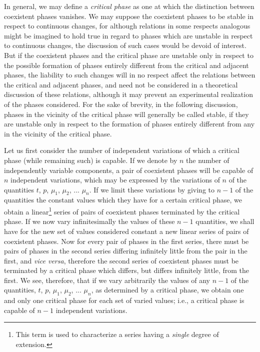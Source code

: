 \documentclass[12pt]{article}
\begin{document}
In general, we may define a \textit{critical phase} as one at which the distinction between coexistent phases vanishes. We may suppose the coexistent phases to be stable in respect to continuous changes, for although relations in some respects analogous might be imagined to hold true in regard to phases which are unstable in respect to continuous changes, the discussion of such cases would be devoid of interest. But if the coexistent phases and the critical phase are unstable only in respect to the possible formation of phases entirely different from the critical and adjacent phases, the liability to such changes will in no respect affect the relations between the critical and adjacent phases, and need not be considered in a theoretical discussion of these relations, although it may prevent an experimental realization of the phases considered. For the sake of brevity, in the following discussion, phases in the vicinity of the critical phase will generally be called stable, if they are unstable only in respect to the formation of phases entirely different from any in the vicinity of the critical phase. 

Let us first consider the number of independent variations of which a critical phase (while remaining such) is capable. If we denote by $n$ the number of independently variable components, a pair of coexistent phases will be capable of $n$ independent variations, which may be expressed by the variations of $n$ of the quantities $t$, $p$, $\mu_1$, $\mu_2$, ... $\mu_n$. If we limit these variations by giving to $n -1$ of the quantities the constant values which they have for a certain critical phase, we obtain a linear\footnote{This term is used to characterize a series having a \textit{single} degree of extension.} series of pairs of coexistent phases terminated by the critical phase. If we now vary infinitesimally the values of these $n -1$ quantities, we shall have for the new set of values considered constant a new linear series of pairs of coexistent phases. Now for every pair of phases in the first series, there must be pairs of phases in the second series differing infinitely little from the pair in the first, and \textit{vice versa}, therefore the second series of coexistent phases must be terminated by a critical phase which differs, but differs infinitely little, from the first. We see, therefore, that if we vary arbitrarily the values of any $n -1$ of the quantities, $t$, $p$, $\mu_1$, $\mu_2$, ... $\mu_n$, as determined by a critical phase, we obtain one and only one critical phase for each set of varied values; i.e., a critical phase is capable of $n -1$ independent variations.
\end{document}
